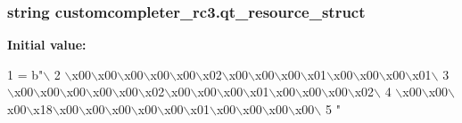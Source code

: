\subsubsection[{qt\+\_\+resource\+\_\+struct}]{\setlength{\rightskip}{0pt plus 5cm}string customcompleter\+\_\+rc3.\+qt\+\_\+resource\+\_\+struct}\label{namespacecustomcompleter__rc3_a2e42e21a7d0fed639e25f0340eb37d4d}
{\bfseries Initial value\+:}
\begin{DoxyCode}
1 = b\textcolor{stringliteral}{"\(\backslash\)}
2 \textcolor{stringliteral}{\(\backslash\)x00\(\backslash\)x00\(\backslash\)x00\(\backslash\)x00\(\backslash\)x00\(\backslash\)x02\(\backslash\)x00\(\backslash\)x00\(\backslash\)x00\(\backslash\)x01\(\backslash\)x00\(\backslash\)x00\(\backslash\)x00\(\backslash\)x01\(\backslash\)}
3 \textcolor{stringliteral}{\(\backslash\)x00\(\backslash\)x00\(\backslash\)x00\(\backslash\)x00\(\backslash\)x00\(\backslash\)x02\(\backslash\)x00\(\backslash\)x00\(\backslash\)x00\(\backslash\)x01\(\backslash\)x00\(\backslash\)x00\(\backslash\)x00\(\backslash\)x02\(\backslash\)}
4 \textcolor{stringliteral}{\(\backslash\)x00\(\backslash\)x00\(\backslash\)x00\(\backslash\)x18\(\backslash\)x00\(\backslash\)x00\(\backslash\)x00\(\backslash\)x00\(\backslash\)x00\(\backslash\)x01\(\backslash\)x00\(\backslash\)x00\(\backslash\)x00\(\backslash\)x00\(\backslash\)}
5 \textcolor{stringliteral}{"}
\end{DoxyCode}
